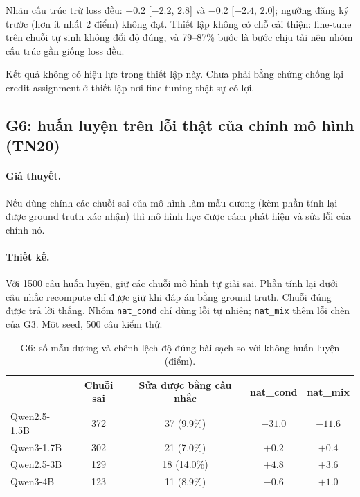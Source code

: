 \documentclass[11pt]{article}
\begin{document}
Nhãn cấu trúc trừ loss đều: $+0.2$ [$-2.2$, $2.8$] và $-0.2$ [$-2.4$, $2.0$]; ngưỡng đăng ký trước (hơn ít nhất
2 điểm) không đạt. Thiết lập không có chỗ cải thiện: fine-tune trên chuỗi tự sinh không đổi độ đúng, và 79--87\%
bước là bước chịu tải nên nhóm cấu trúc gần giống loss đều.

\begin{ketluan}
Kết quả không có hiệu lực trong thiết lập này. Chưa phải bằng chứng chống lại credit assignment ở thiết lập
nơi fine-tuning thật sự có lợi.
\end{ketluan}

\subsection{G6: huấn luyện trên lỗi thật của chính mô hình (TN20)}

\paragraph{Giả thuyết.} Nếu dùng chính các chuỗi sai của mô hình làm mẫu dương (kèm phần tính lại được ground
truth xác nhận) thì mô hình học được cách phát hiện và sửa lỗi của chính nó.

\paragraph{Thiết kế.} Với 1500 câu huấn luyện, giữ các chuỗi mô hình tự giải sai. Phần tính lại dưới câu nhắc
recompute chỉ được giữ khi đáp án bằng ground truth. Chuỗi đúng được trả lời thẳng. Nhóm \texttt{nat\_cond} chỉ
dùng lỗi tự nhiên; \texttt{nat\_mix} thêm lỗi chèn của G3. Một seed, 500 câu kiểm thử.

\begin{table}[h]
\centering\small
\caption{G6: số mẫu dương và chênh lệch độ đúng bài sạch so với không huấn luyện (điểm).}
\begin{tabular}{lcccc}
\toprule
 & Chuỗi sai & Sửa được bằng câu nhắc & nat\_cond & nat\_mix \\
\midrule
Qwen2.5-1.5B & 372 & 37 (9.9\%) & $-31.0$ & $-11.6$ \\
Qwen3-1.7B & 302 & 21 (7.0\%) & $+0.2$ & $+0.4$ \\
Qwen2.5-3B & 129 & 18 (14.0\%) & $+4.8$ & $+3.6$ \\
Qwen3-4B & 123 & 11 (8.9\%) & $-0.6$ & $+1.0$ \\
\bottomrule
\end{tabular}
\end{table}
\end{document}
